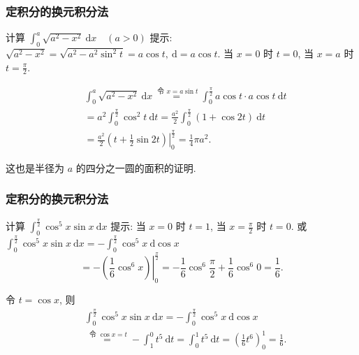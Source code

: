 \documentclass[
10pt,
aspectratio=43,
]{beamer}
\begin{document}
\begin{frame}
	\frametitle{定积分的换元积分法}
	\everymath{\displaystyle}
	\begin{block}{计算 $\int_0^a \sqrt{a^2-x^2} \mathrm{~d} x\quad(a>0)$}
		提示: $\sqrt{a^2-x^2}=\sqrt{a^2-a^2 \sin ^2 t}=a \cos t, \mathrm{~d}=a \cos t$. 当 $x=0$ 时 $t=0$, 当 $x=a$ 时 $t=\frac{\pi}{2}$.
	\end{block}
	\pause
	\begin{exampleblock}{}
		$$
			\begin{aligned}
				 & \int_0^a \sqrt{a^2-x^2} \mathrm{~d}x \stackrel{\text { 令 } x=a \sin t}{=} \int_0^{\frac{\pi}{2}} a \cos t \cdot a \cos t \mathrm{~d}t \\
				 & =a^2 \int_0^{\frac{\pi}{2}} \cos ^2 t \mathrm{~d}t=\frac{a^2}{2} \int_0^{\frac{\pi}{2}}(1+\cos 2 t) \mathrm{~d}t                      \\
				 & =\frac{a^2}{2}\left.\left(t+\frac{1}{2} \sin 2 t\right)\right|_0^{\frac{\pi}{2}}=\frac{1}{4} \pi a^2 .
			\end{aligned}
		$$
	\end{exampleblock}
	\pause
	这也是半径为 $a$ 的四分之一圆的面积的证明.
\end{frame}

\begin{frame}
	\frametitle{定积分的换元积分法}
	\everymath{\displaystyle}
	\begin{block}{计算 $\int_0^{\frac{\pi}{2}} \cos ^5 x \sin x \mathrm{~d} x$}
		提示: 当 $x=0$ 时 $t=1$, 当 $x=\frac{\pi}{2}$ 时 $t=0$. 或 $\int_0^{\frac{\pi}{2}} \cos ^5 x \sin x \mathrm{~d} x=-\int_0^{\frac{\pi}{2}} \cos ^5 x \mathrm{~d} \cos x$
		$$
			=-\left.\left(\frac{1}{6} \cos ^6 x\right)\right|_0 ^{\frac{\pi}{2}}=-\frac{1}{6} \cos ^6 \frac{\pi}{2}+\frac{1}{6} \cos ^6 0=\frac{1}{6} .
		$$
	\end{block}
	\pause
	\begin{exampleblock}{}
		令 $t=\cos x$, 则
		$$
			\begin{aligned}
				 & \int_0^{\frac{\pi}{2}} \cos ^5 x \sin x \mathrm{~d} x=-\int_0^{\frac{\pi}{2}} \cos ^5 x \mathrm{~d}\cos x                               \\
				 & \stackrel{\text { 令 } \cos x=t}{=}-\int_1^0 t^5 \mathrm{~d} t=\int_0^1 t^5 \mathrm{~d} t=\left(\frac{1}{6} t^6\right)_0^1=\frac{1}{6} .
			\end{aligned}
		$$
	\end{exampleblock}
\end{frame}
\end{document}
